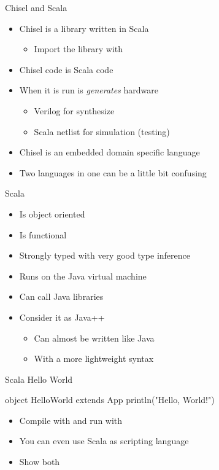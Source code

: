 \begin{frame}[fragile]{Chisel and Scala}
\begin{itemize}
\item Chisel is a library written in Scala
\begin{itemize}
\item Import the library with 
\end{itemize}
\item Chisel code is Scala code
\item When it is run is \emph{generates} hardware
\begin{itemize}
\item Verilog for synthesize
\item Scala netlist for simulation (testing)
\end{itemize}
\item Chisel is an embedded domain specific language
\item Two languages in one can be a little bit confusing
\end{itemize}
\end{frame}

\begin{frame}[fragile]{Scala}
\begin{itemize}
\item Is object oriented
\item Is functional
\item Strongly typed with very good type inference
\item Runs on the Java virtual machine
\item Can call Java libraries
\item Consider it as Java++
\begin{itemize}
\item Can almost be written like Java
\item With a more lightweight syntax
\end{itemize}
\end{itemize}
\end{frame}

\begin{frame}[fragile]{Scala Hello World}
\begin{chisel}
object HelloWorld extends App {
  println("Hello, World!")
}
\end{chisel}
\begin{itemize}
\item Compile with  and run with 
\item You can even use Scala as scripting language
\item Show both
\end{itemize}
\end{frame}



